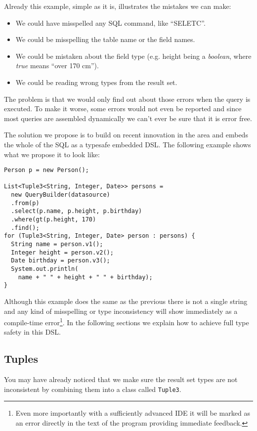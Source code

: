 \documentclass{sig-alternate}
\begin{document}
Already this example, simple as it is, illustrates the mistakes we can make:
\begin{itemize}
\item We could have misspelled any SQL command, like ``SELETC''.
\item We could be misspelling the table name or the field names.
\item We could be mistaken about the field type (e.g. height being a \emph{boolean}, where \emph{true} means ``over 170 cm'').
\item We could be reading wrong types from the result set.
\end{itemize}
The problem is that we would only find out about those errors when the query is executed. To make it worse, some errors would not even be reported and since most queries are assembled dynamically we can't ever be sure that it is error free.

The solution we propose is to build on recent innovation in the area and embeds the whole of the SQL as a typesafe embedded DSL. The following example shows what we propose it to look like:

\begin{verbatim}
Person p = new Person();

List<Tuple3<String, Integer, Date>> persons = 
  new QueryBuilder(datasource)
  .from(p)
  .select(p.name, p.height, p.birthday)
  .where(gt(p.height, 170)
  .find();
for (Tuple3<String, Integer, Date> person : persons) {
  String name = person.v1();
  Integer height = person.v2();
  Date birthday = person.v3();
  System.out.println(
    name + " " + height + " " + birthday);
}
\end{verbatim}

Although this example does the same as the previous there is not a single string and any kind of misspelling or type inconsistency will show immediately as a compile-time error\footnote{Even more importantly with a sufficiently advanced IDE it will be marked as an error directly in the text of the program providing immediate feedback.}. In the following sections we explain how to achieve full type safety in this DSL.

\subsection{Tuples}

You may have already noticed that we make sure the result set types are not inconsistent by combining them into a class called \verb!Tuple3!.
\end{document}
